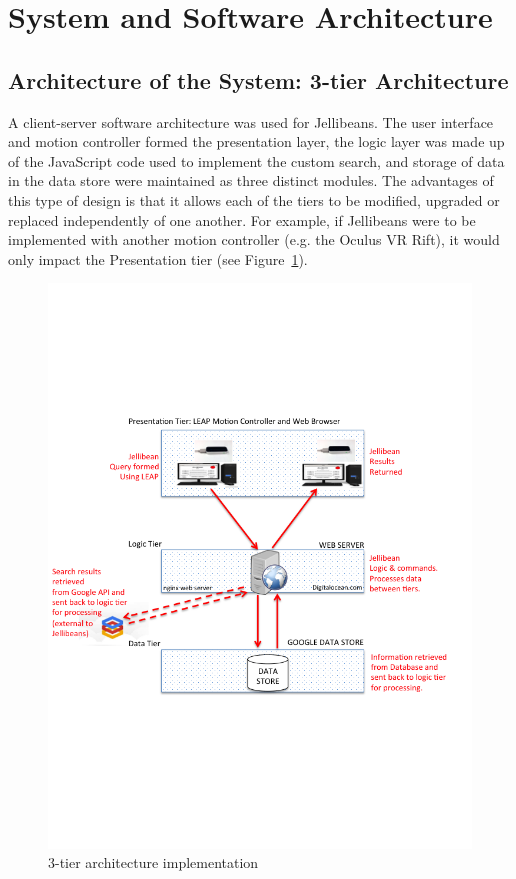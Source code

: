 \documentclass[a4paper, 11pt]{article}
\begin{document}
\section{System and Software Architecture}

\subsection{Architecture of the System: 3-tier Architecture}
A client-server software architecture was used for Jellibeans. The user interface and motion controller formed the presentation layer, the logic layer was made up of the JavaScript code used to implement the custom search, and storage of data in the data store were maintained as three distinct modules. The advantages of this type of design is that it allows each of the tiers to be modified, upgraded or replaced independently of one another. For example, if Jellibeans were to be implemented with another motion controller (e.g. the Oculus VR Rift), it would only impact the Presentation tier (see Figure~\ref{ntier}).
\begin{figure}[H]
\begin{center}
\includegraphics[scale=0.65]{ntier}
\caption{3-tier architecture implementation}
\label{ntier}
\end{center}
\end{figure}
\end{document}
